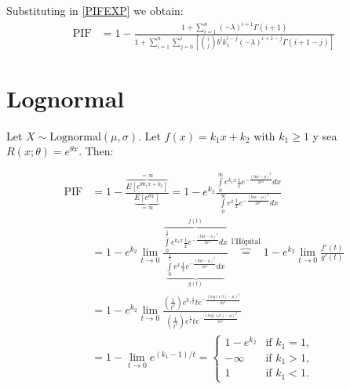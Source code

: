 \documentclass{article}
\begin{document}
Substituting in \eqref{PIFEXP} we obtain: 
\begin{equation}
\begin{aligned}
    \textrm{PIF} & = 1 - \frac{ 1 + \sum\limits_{i = 1}^{n} (-\lambda)^{i + 1} \Gamma(i + 1) }{  1 + \sum\limits_{i=1}^{n} \sum\limits_{j = 0}^{i} \left[ {i \choose j} b^{i} k_1 ^{i - j}  (-\lambda)^{i + 1 -j } \Gamma(i + 1 - j ) \right] } 
\end{aligned}
\end{equation}

\section{Lognormal}

Let $X \sim \textrm{Lognormal}(\mu,\sigma)$. Let $f(x) = k_1 x + k_2$ with $k_1 \geq 1$ y sea $R(x;\theta) = e^{\theta x}$. Then:


\begin{equation}
    \begin{aligned}
    \textrm{PIF} & = 1 - \frac{\overbrace{E[e^{\theta k_1 x + k_2}]}^{ = \infty}}{\underbrace{E[e^{\theta x}]}_{= \infty}} = 1 - e^{k_2} \frac{ \int\limits_{0}^{\infty} e^{k_1 x} \frac{1}{x} e^{-\frac{(\textrm{ln} x - \mu)^2}{2\sigma^2}} dx}{ \int\limits_{0}^{\infty} e^{ x} \frac{1}{x} e^{-\frac{(\textrm{ln} x - \mu)^2}{2\sigma^2}} dx} \\ & = 1 - e^{k_2} \lim_{t \to 0} \frac{  \overbrace{ \int\limits_{0}^{\frac{1}{t}} e^{k_1 x} \frac{1}{x} e^{-\frac{(\textrm{ln} x - \mu)^2}{2\sigma^2}} dx}^{f(t)}  }{ \underbrace{ \int\limits_{0}^{\frac{1}{t}} e^{ x} \frac{1}{x} e^{-\frac{(\textrm{ln} x - \mu)^2}{2\sigma^2}} dx}_{g(t)} }  \overbrace{=}^{\textrm{l'Hôpital}}  1 - e^{k_2} \lim_{t \to 0} \frac{f'(t)}{g'(t)}  \\ 
    & = 1 - e^{k_2} \lim_{t \to 0} \frac{\left(\frac{1}{t^2}\right) e^{k_1 \frac{1}{t}} t e^{-\frac{\left(log(1/t) - \mu\right)^2}{2\sigma^2}}}{\left(\frac{1}{t^2}\right) e^{ \frac{1}{t}} t e^{-\frac{\left(log(1/t) - \mu\right)^2}{2\sigma^2}}} \\ & = 1 - \lim_{t \to 0}  e^{(k_1 - 1)/t} = 
    \begin{cases}
    1 - e^{k_2} & \textrm{if } k_1 = 1, \\
    -\infty     & \textrm{if } k_1 > 1, \\
    1           & \textrm{if } k_1 < 1.
    \end{cases}
    \end{aligned}
\end{equation}
\end{document}
